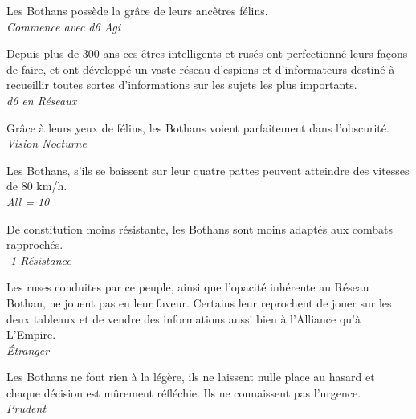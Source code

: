 \begin{description}[align=left]
\item [Agilité du Félin] 			%
		Les Bothans possède la grâce de leurs ancêtres félins.\\
		\textit{Commence avec d6 Agi}

\item [Service de renseignement] 	%
		Depuis plus de 300 ans ces êtres intelligents et rusés ont perfectionné leurs façons de faire, et ont développé un vaste réseau d’espions et d’informateurs destiné à recueillir toutes sortes d’informations sur les sujets les plus importants.\\
		\textit{d6 en Réseaux}

\item [Comme en plein jour] 		%
		Grâce à leurs yeux de félins, les Bothans voient parfaitement dans l’obscurité.\\
		\textit{Vision Nocturne}

\item [Déplacement rapide] 			%
		Les Bothans, s’ils se baissent sur leur quatre pattes peuvent atteindre des vitesses de 80 km/h.\\
		\textit{All = 10}

\item [Frêle] 						%
		De constitution moins résistante, les Bothans sont moins adaptés aux combats rapprochés.\\
		\textit{-1 Résistance}

\item [Mauvaise réputation] 		%
		Les ruses conduites par ce peuple, ainsi que l’opacité inhérente au Réseau Bothan, ne jouent pas en leur faveur. Certains leur reprochent de jouer sur les deux tableaux et de vendre des informations aussi bien à l’Alliance qu’à L’Empire.\\
		\textit{\'Etranger}

\item [Prudent] 					%
		Les Bothans ne font rien à la légère, ils ne laissent nulle place au hasard et chaque décision est mûrement réfléchie. Ils ne connaissent pas l’urgence.\\
		\textit{Prudent}
\end{description}